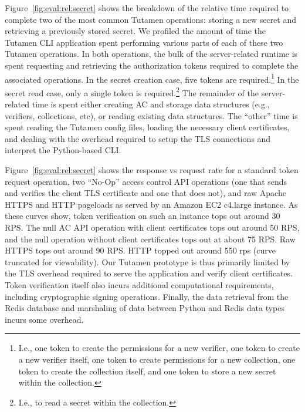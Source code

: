 Figure~\ref{fig:eval:rel:secret} shows the breakdown of the relative
time required to complete two of the most common Tutamen operations:
storing a new secret and retrieving a previously stored secret. We
profiled the amount of time the Tutamen CLI application spent
performing various parts of each of these two Tutamen operations. In
both operations, the bulk of the server-related runtime is spent
requesting and retrieving the authorization tokens required to
complete the associated operations. In the secret creation case, five
tokens are required.\footnote{I.e., one token to create the
  permissions for a new verifier, one token to create a new verifier
  itself, one token to create permissions for a new collection, one
  token to create the collection itself, and one token to store a new
  secret within the collection.} In the secret read case, only a
single token is required.\footnote{I.e., to read a secret within the
  collection.}  The remainder of the server-related time is spent
either creating AC and storage data structures (e.g., verifiers,
collections, etc), or reading existing data structures. The ``other''
time is spent reading the Tutamen config files, loading the necessary
client certificates, and dealing with the overhead required to setup
the TLS connections and interpret the Python-based CLI.
 
Figure~\ref{fig:eval:rel:secret} shows the response vs request rate
for a standard token request operation, two ``No-Op'' access control
API operations (one that sends and verifies the client TLS certificate
and one that does not), and raw Apache HTTPS and HTTP pageloads as
served by an Amazon EC2 c4.large instance. As these curves show, token
verification on such an instance tops out around 30 RPS. The null AC
API operation with client certificates tops out around 50 RPS, and the
null operation without client certificates tops out at about 75
RPS. Raw HTTPS tops out around 90 RPS. HTTP topped out around 550 rps
(curve truncated for viewability). Our Tutamen prototype is thus
primarily limited by the TLS overhead required to serve the
application and verify client certificates. Token verification itself
also incurs additional computational requirements, including
cryptographic signing operations. Finally, the data retrieval from the
Redis database and marshaling of data between Python and Redis data
types incurs some overhead.

